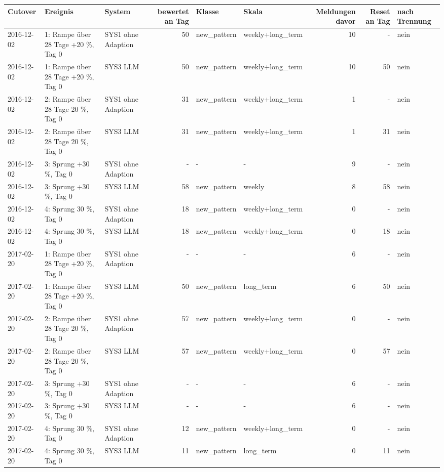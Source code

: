 \begin{tabular}{lllrllrrl}
\toprule
Cutover & Ereignis & System & bewertet an Tag & Klasse & Skala & Meldungen davor & Reset an Tag & nach Trennung \\
\midrule
2016-12-02 & 1: Rampe über 28 Tage +20 \%, Tag 0 & SYS1 ohne Adaption & 50 & new\_pattern & weekly+long\_term & 10 & - & nein \\
2016-12-02 & 1: Rampe über 28 Tage +20 \%, Tag 0 & SYS3 LLM & 50 & new\_pattern & weekly+long\_term & 10 & 50 & nein \\
2016-12-02 & 2: Rampe über 28 Tage \textminus{}20 \%, Tag 0 & SYS1 ohne Adaption & 31 & new\_pattern & weekly+long\_term & 1 & - & nein \\
2016-12-02 & 2: Rampe über 28 Tage \textminus{}20 \%, Tag 0 & SYS3 LLM & 31 & new\_pattern & weekly+long\_term & 1 & 31 & nein \\
2016-12-02 & 3: Sprung +30 \%, Tag 0 & SYS1 ohne Adaption & - & - & - & 9 & - & nein \\
2016-12-02 & 3: Sprung +30 \%, Tag 0 & SYS3 LLM & 58 & new\_pattern & weekly & 8 & 58 & nein \\
2016-12-02 & 4: Sprung \textminus{}30 \%, Tag 0 & SYS1 ohne Adaption & 18 & new\_pattern & weekly+long\_term & 0 & - & nein \\
2016-12-02 & 4: Sprung \textminus{}30 \%, Tag 0 & SYS3 LLM & 18 & new\_pattern & weekly+long\_term & 0 & 18 & nein \\
2017-02-20 & 1: Rampe über 28 Tage +20 \%, Tag 0 & SYS1 ohne Adaption & - & - & - & 6 & - & nein \\
2017-02-20 & 1: Rampe über 28 Tage +20 \%, Tag 0 & SYS3 LLM & 50 & new\_pattern & long\_term & 6 & 50 & nein \\
2017-02-20 & 2: Rampe über 28 Tage \textminus{}20 \%, Tag 0 & SYS1 ohne Adaption & 57 & new\_pattern & weekly+long\_term & 0 & - & nein \\
2017-02-20 & 2: Rampe über 28 Tage \textminus{}20 \%, Tag 0 & SYS3 LLM & 57 & new\_pattern & weekly+long\_term & 0 & 57 & nein \\
2017-02-20 & 3: Sprung +30 \%, Tag 0 & SYS1 ohne Adaption & - & - & - & 6 & - & nein \\
2017-02-20 & 3: Sprung +30 \%, Tag 0 & SYS3 LLM & - & - & - & 6 & - & nein \\
2017-02-20 & 4: Sprung \textminus{}30 \%, Tag 0 & SYS1 ohne Adaption & 12 & new\_pattern & weekly+long\_term & 0 & - & nein \\
2017-02-20 & 4: Sprung \textminus{}30 \%, Tag 0 & SYS3 LLM & 11 & new\_pattern & long\_term & 0 & 11 & nein \\
\bottomrule
\end{tabular}
